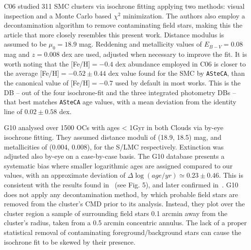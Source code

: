 \documentclass[a4paper,fleqn,usenatbib]{mnras}
\begin{document}
%
C06 studied 311 SMC clusters via isochrone fitting applying two methods: visual
inspection and a Monte Carlo based $\chi^2$ minimization. The authors also
employ a decontamination algorithm to remove contaminating field stars, making
this the article that more closely resembles this present work.
Distance modulus is assumed to be $\mu_0{=}18.9$ mag. Reddening and
metallicity values of $E_{B-V}{=}0.08$ mag and $z=0.008$ dex are used, adjusted
when necessary to improve the fit.
It is worth noting that the [Fe/H]${=}-0.4$ dex abundance employed in
C06 is closer to the average [Fe/H]${=}-0.52{\pm}0.44$ dex value found for the
SMC by \texttt{ASteCA}, than the canonical value of [Fe/H]${=}-0.7$ used by
default in most works.
This is the DB -- out of the four isochrone-fit and the three integrated
photometry DBs -- that best matches \texttt{ASteCA} age values, with a mean
deviation from the identity line of $0.02\pm0.58$ dex.

%

G10 analysed over 1500 OCs with ages < 1Gyr in both Clouds via by-eye isochrone
fitting. They assumed distance moduli of (18.9, 18.5) mag, and metallicities of
(0.004, 0.008), for the S/LMC respectively. Extinction was adjusted also by-eye
on a case-by-case basis.
The G10 database presents a systematic bias where smaller logarithmic ages are
assigned compared to our values, with an approximate deviation of $\Delta
\log(age/yr){\simeq}0.23\pm0.46$. This is consistent with the results found
in~\cite{Choudhury_2015} (see Fig. 5), and later confirmed
in~\cite{Piatti_2015a,Piatti_2015b}.
%
G10 does not apply any decontamination method, by which probable field stars are
removed from the cluster's CMD prior to its analysis. Instead, they plot over
the cluster region a sample of surrounding field stars 0.1 arcmin away from the
cluster's radius, taken from a 0.5 arcmin concentric annulus. The lack of a
proper statistical removal of contaminating foreground/background stars can
cause the isochrone fit to be skewed by their presence.
\end{document}
